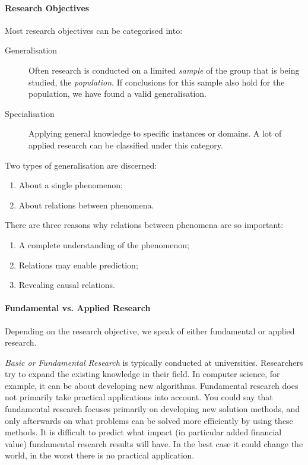 \paragraph{Research Objectives}

Most research objectives can be categorised into:

\begin{description}
	\item[Generalisation] Often research is conducted on a limited \emph{sample} of the group that is being studied, the \emph{population}. If conclusions for this sample also hold for the population, we have found a valid generalisation.
    \item[Specialisation] Applying general knowledge to specific instances or domains. A lot of applied research can be classified under this category.
\end{description}

Two types of generalisation are discerned:

\begin{enumerate}
	\item About a single phenomenon;
	\item About relations between phenomena.
\end{enumerate}

There are three reasons why relations between phenomena are so important:

\begin{enumerate}
	\item A complete understanding of the phenomenon;
	\item Relations may enable prediction;
	\item Revealing causal relations.
\end{enumerate}

\paragraph {Fundamental vs. Applied Research}
Depending on the research objective, we speak of either fundamental or applied research.

\emph{Basic or Fundamental Research} is typically conducted at universities. Researchers try to expand the existing knowledge in their field. In computer science, for example, it can be about developing new algorithms. Fundamental research does not primarily take practical applications into account. You could say that fundamental research focuses primarily on developing new solution methods, and only afterwards on what problems can be solved more efficiently by using these methods. It is difficult to predict what impact (in particular added financial value) fundamental research results will have. In the best case it could change the world, in the worst there is no practical application.

